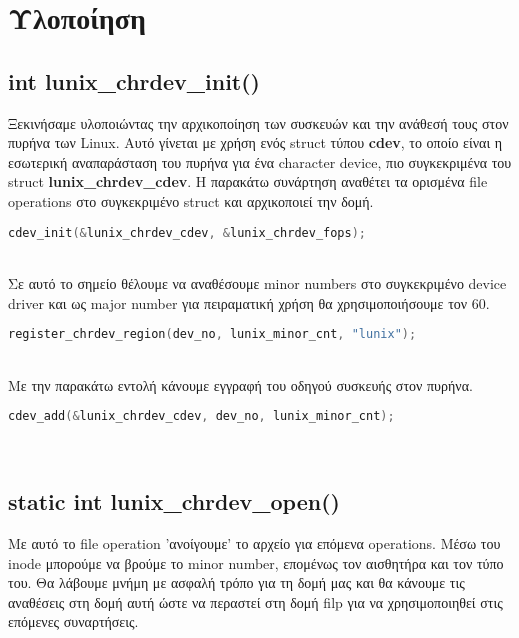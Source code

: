\documentclass{article}
\begin{document}
\section{Υλοποίηση}
\subsection{int lunix\_chrdev\_init()}
Ξεκινήσαμε υλοποιώντας την αρχικοποίηση των συσκευών και την ανάθεσή τους στον πυρήνα των Linux. Αυτό 
γίνεται με χρήση ενός struct τύπου \textbf{cdev}, το οποίο είναι η εσωτερική αναπαράσταση του πυρήνα
για ένα character device, πιο συγκεκριμένα του struct \textbf{lunix\_chrdev\_cdev}. Η παρακάτω συνάρτηση
αναθέτει τα ορισμένα file operations στο συγκεκριμένο struct και αρχικοποιεί την δομή. \\

\begin{lstlisting}[language=C]
cdev_init(&lunix_chrdev_cdev, &lunix_chrdev_fops);
\end{lstlisting} \\

Σε αυτό το σημείο θέλουμε να αναθέσουμε minor numbers στο συγκεκριμένο device driver και ως major number
για πειραματική χρήση θα χρησιμοποιήσουμε τον 60. \\

\begin{lstlisting}[language=C]
register_chrdev_region(dev_no, lunix_minor_cnt, "lunix");
\end{lstlisting} \\

Με την παρακάτω εντολή κάνουμε εγγραφή του οδηγού συσκευής στον πυρήνα. \\

\begin{lstlisting}[language=C]
cdev_add(&lunix_chrdev_cdev, dev_no, lunix_minor_cnt);
\end{lstlisting} \\

\subsection{static int lunix\_chrdev\_open()}
Με αυτό το file operation 'ανοίγουμε' το αρχείο για επόμενα operations. Μέσω του inode μπορούμε να
βρούμε το minor number, επομένως τον αισθητήρα και τον τύπο του. Θα λάβουμε μνήμη με ασφαλή τρόπο για
τη δομή μας και θα κάνουμε τις αναθέσεις στη δομή αυτή ώστε να περαστεί στη δομή filp για να χρησιμοποιηθεί
στις επόμενες συναρτήσεις. \\
\end{document}

